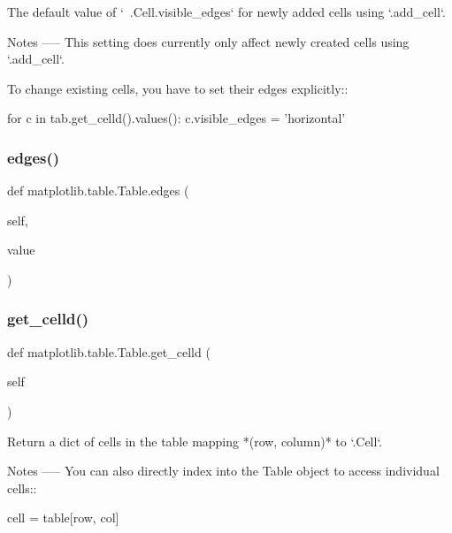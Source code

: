 \begin{DoxyVerb}The default value of `~.Cell.visible_edges` for newly added
cells using `.add_cell`.

Notes
-----
This setting does currently only affect newly created cells using
`.add_cell`.

To change existing cells, you have to set their edges explicitly::

    for c in tab.get_celld().values():
c.visible_edges = 'horizontal'\end{DoxyVerb}
 \mbox{\label{classmatplotlib_1_1table_1_1Table_a1696117165cb9ae0f44d1fd3f393a9f9}} 
\subsubsection{\texorpdfstring{edges()}{edges()}\hspace{0.1cm}{\footnotesize\ttfamily [2/2]}}
{\footnotesize\ttfamily def matplotlib.\+table.\+Table.\+edges (\begin{DoxyParamCaption}\item[{}]{self,  }\item[{}]{value }\end{DoxyParamCaption})}

\mbox{\label{classmatplotlib_1_1table_1_1Table_a8c2a9e7e76f3ae807058106ffe426dc6}} 
\subsubsection{\texorpdfstring{get\+\_\+celld()}{get\_celld()}}
{\footnotesize\ttfamily def matplotlib.\+table.\+Table.\+get\+\_\+celld (\begin{DoxyParamCaption}\item[{}]{self }\end{DoxyParamCaption})}

\begin{DoxyVerb}Return a dict of cells in the table mapping *(row, column)* to
`.Cell`\s.

Notes
-----
You can also directly index into the Table object to access individual
cells::

    cell = table[row, col]\end{DoxyVerb}
 \mbox{\label{classmatplotlib_1_1table_1_1Table_a24aed221960a92b7c146a4b965617576}} 
